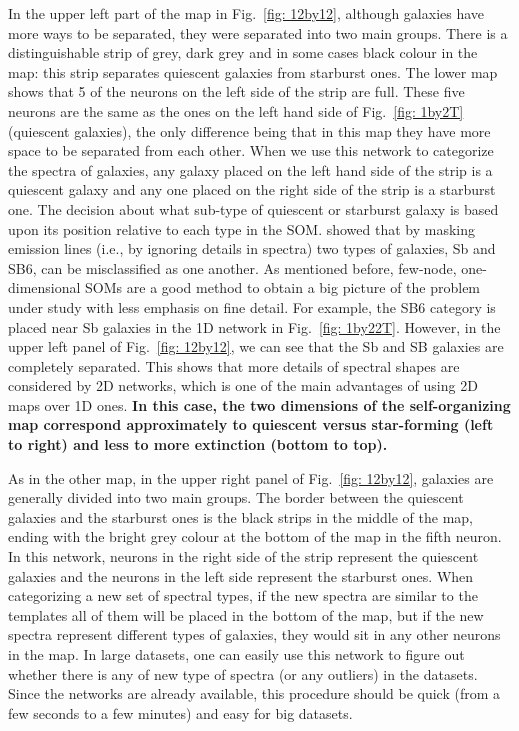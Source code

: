     
        In the upper left part of the map in Fig.~\ref{fig: 12by12}, although galaxies have more ways to be separated, they were separated into two main groups.
        There is a distinguishable strip of grey, dark grey and in some cases black colour in the map:
        this strip separates quiescent galaxies from starburst ones.
        The lower map shows that 5 of the neurons on the left side of the strip are full. 
        These five neurons are the same as the ones on the left hand side of Fig.~\ref{fig: 1by2T} (quiescent galaxies),
        the only difference being that in this map they have more space to be separated from each other.
        When we use this network to categorize the spectra of galaxies, any galaxy placed on the left hand side of the strip is a quiescent galaxy and any one placed on the right side of the strip is a starburst one.
        The decision about what sub-type of quiescent or starburst galaxy is based upon its position relative to each type in the SOM.
         showed that by masking emission lines (i.e., by ignoring details in spectra) two types of galaxies, Sb and SB6, can be misclassified as one another.
        As mentioned before, few-node, one-dimensional SOMs are a good method to obtain a big picture of the problem under study with less emphasis on fine detail. 
        For example, the SB6 category is placed near Sb galaxies in the 1D network in Fig.~\ref{fig: 1by22T}.
        However, in the upper left panel of Fig.~\ref{fig: 12by12}, we can see that the Sb and SB galaxies are completely separated. 
        This shows that more details of spectral shapes are considered by 2D networks, which is one of the main advantages of  using 2D maps over 1D ones.
        \textbf{In this case, the two dimensions of the self-organizing map correspond approximately to quiescent versus star-forming (left to right) and less to more extinction (bottom to top).} 
    
        As in the other map, in the upper right panel of Fig.~\ref{fig: 12by12}, galaxies are generally divided into two main groups.
        The border between the quiescent galaxies and the starburst ones is the black strips in the middle of the map, ending with the bright grey colour at the bottom of the map in the fifth neuron.
        In this network, neurons in the right side of the strip represent the quiescent galaxies and the neurons in the left side represent the starburst ones. 
        When categorizing a new set of spectral types, if the new spectra are similar to the  templates all of them will be placed in the bottom of the map, but if the new spectra represent different types of galaxies, they would sit in any other neurons in the map.
        In large datasets, one can easily use this network to figure out whether there is any of new type of spectra (or any outliers) in the datasets. 
        Since the networks are already available, this procedure should be quick (from a few seconds to a few minutes) and easy for big datasets.
          
